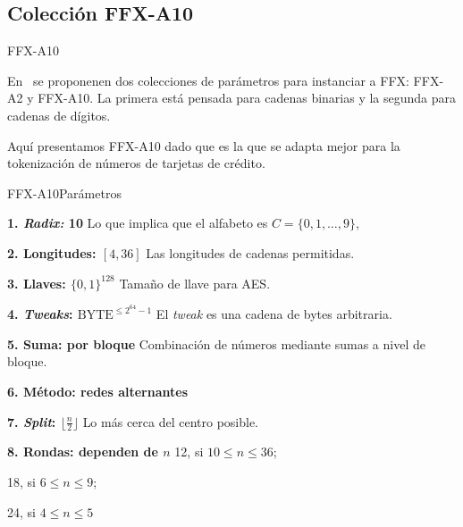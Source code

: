%
%

\subsection{Colección FFX-A10}

\begin{frame}{FFX-A10}

  En~\cite{ffx_2} se proponenen dos colecciones de parámetros para instanciar
  a FFX: FFX-A2 y FFX-A10. La primera está pensada para cadenas binarias y la
  segunda para cadenas de dígitos.

  Aquí presentamos FFX-A10 dado que es la que se adapta mejor para la
  tokenización de números de tarjetas de crédito.

\end{frame}

\begin{frame}{FFX-A10}{Parámetros}

  {
    \begin{block}{\textbf{1. \textit{Radix:} 10}}
      Lo que implica que el alfabeto es $ C = \{ 0, 1, \dots, 9 \} $,
    \end{block}

    \begin{block}{\textbf{2. Longitudes: $ [ 4, 36 ] $}}
      Las longitudes de cadenas permitidas.
    \end{block}

    \begin{block}{\textbf{3. Llaves: $ \{ 0, 1\}^{128} $}}
      Tamaño de llave para AES.
    \end{block}
  }

  {
    \begin{block}{\textbf{4. \textit{Tweaks}: $ \text{BYTE}^{\leq 2^{64} - 1} $}}
      El \textit{tweak} es una cadena de bytes arbitraria.
    \end{block}

    \begin{block}{\textbf{5. Suma: por bloque}}
      Combinación de números mediante sumas a nivel de bloque.
    \end{block}

    \begin{block}{\textbf{6. Método: redes alternantes}}
    \end{block}
  }

  {
    \begin{block}{\textbf{7. \textit{Split}: $ \lfloor \frac{n}{2} \rfloor $ }}
      Lo más cerca del centro posible.
    \end{block}

    \begin{block}{\textbf{8. Rondas: dependen de $ n $}}
      12, si $ 10 \leq n \leq 36 $; \par
      18, si $ 6 \leq n \leq 9 $; \par
      24, si $ 4 \leq n \leq 5 $
    \end{block}
  }

\end{frame}

